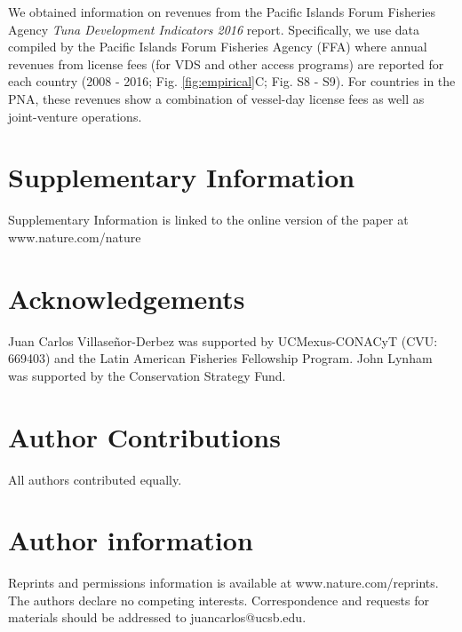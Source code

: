 \documentclass[12pt]{article}
\begin{document}
We obtained information on revenues from the Pacific Islands Forum Fisheries Agency \emph{Tuna Development Indicators 2016} report.  Specifically, we use data compiled by the Pacific Islands Forum Fisheries Agency (FFA\cite{ffa_2017}) where annual revenues from license fees (for VDS and other access programs) are reported for each country (2008 - 2016; Fig. \ref{fig:empirical}C; Fig. S8 - S9). For countries in the PNA, these revenues show a combination of vessel-day license fees as well as joint-venture operations.





\section{Supplementary Information}

Supplementary Information is linked to the online version of the paper at www.nature.com/nature

\section{Acknowledgements}

Juan Carlos Villaseñor-Derbez was supported by UCMexus-CONACyT (CVU: 669403) and the Latin American Fisheries Fellowship Program. John Lynham was supported by the Conservation Strategy Fund.

\section{Author Contributions}

All authors contributed equally.

\section{Author information}

Reprints and permissions information is available at www.nature.com/reprints. The authors declare no competing interests. Correspondence and requests for materials should be addressed to juancarlos@ucsb.edu.

\clearpage

\FloatBarrier
\end{document}
